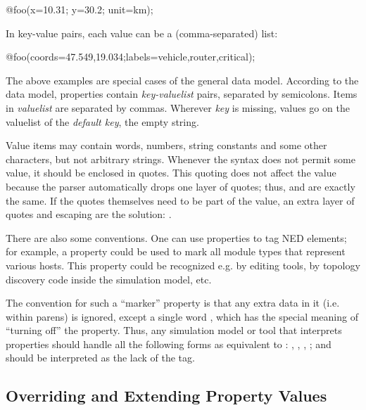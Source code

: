 \begin{ned}
@foo(x=10.31; y=30.2; unit=km);
\end{ned}

In key-value pairs, each value can be a (comma-separated) list:

\begin{ned}
@foo(coords=47.549,19.034;labels=vehicle,router,critical);
\end{ned}

The above examples are special cases of the general data model. According
to the data model, properties contain \textit{key-valuelist} pairs,
separated by semicolons. Items in \textit{valuelist} are separated by
commas. Wherever \textit{key} is missing, values go on the valuelist of the
\textit{default key}, the empty string.

Value items may contain words, numbers, string constants and some other
characters, but not arbitrary strings. Whenever the syntax does not permit
some value, it should be enclosed in quotes. This quoting does not affect
the value because the parser automatically drops one layer of quotes; thus,
 and  are exactly the same. If the
quotes themselves need to be part of the value, an extra layer of quotes
and escaping are the solution: .

There are also some conventions. One can use properties to tag NED
elements; for example, a  property could be used to mark all
module types that represent various hosts. This property could be
recognized e.g. by editing tools, by topology discovery code inside the
simulation model, etc.

The convention for such a ``marker'' property is that any extra data in it
(i.e. within parens) is ignored, except a single word , which has
the special meaning of ``turning off'' the property. Thus, any simulation model
or tool that interprets properties should handle all the following forms as
equivalent to : , ,
, ; and
 should be interpreted as the lack of the 
tag.


\subsection{Overriding and Extending Property Values}
\label{sec:ned-lang:overriding-and-extending-property-values}

